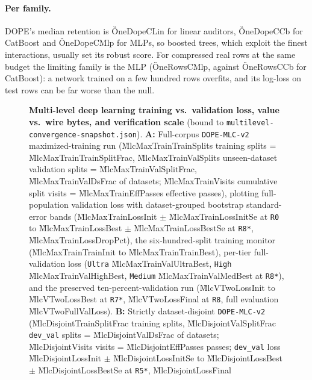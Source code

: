 \paragraph{Per family.}
DOPE's median retention is \G{OneDopeCLin} for linear auditors, \G{OneDopeCCb} for CatBoost and
\G{OneDopeCMlp} for MLPs, so boosted trees, which exploit the finest interactions, usually set its
robust score. For compressed real rows at the same budget the limiting family is the MLP
(\G{OneRowsCMlp}, against \G{OneRowsCCb} for CatBoost): a network trained on a few hundred rows
overfits, and its log-loss on test rows can be far worse than the null.

\begin{figure}[t]
  \centering
  \caption{\textbf{Multi-level deep learning training vs.\ validation loss, value vs.\ wire bytes, and
  verification scale} (bound to \texttt{multilevel-convergence-snapshot.json}).
  \textbf{A:} Full-corpus \texttt{DOPE-MLC-v2} maximized-training run (\G{MlcMaxTrainTrainSplits}
  training splits = \G{MlcMaxTrainTrainSplitFrac}, \G{MlcMaxTrainValSplits} unseen-dataset validation
  splits = \G{MlcMaxTrainValSplitFrac}, \G{MlcMaxTrainValDsFrac} of datasets; \G{MlcMaxTrainVisits}
  cumulative split visits = \G{MlcMaxTrainEffPasses} effective passes), plotting full-population
  validation loss with dataset-grouped bootstrap standard-error bands (\G{MlcMaxTrainLossInit} $\pm$
  \G{MlcMaxTrainLossInitSe} at \texttt{R0} to \G{MlcMaxTrainLossBest} $\pm$ \G{MlcMaxTrainLossBestSe}
  at \texttt{R8*}, \G{MlcMaxTrainLossDropPct}), the six-hundred-split training monitor
  (\G{MlcMaxTrainTrainInit} to \G{MlcMaxTrainTrainBest}), per-tier full-validation loss (\texttt{Ultra}
  \G{MlcMaxTrainValUltraBest}, \texttt{High} \G{MlcMaxTrainValHighBest}, \texttt{Medium}
  \G{MlcMaxTrainValMedBest} at \texttt{R8*}), and the preserved ten-percent-validation run
  (\G{MlcVTwoLossInit} to \G{MlcVTwoLossBest} at \texttt{R7*}, \G{MlcVTwoLossFinal} at \texttt{R8},
  full evaluation \G{MlcVTwoFullValLoss}). \textbf{B:} Strictly dataset-disjoint \texttt{DOPE-MLC-v2}
  (\G{MlcDisjointTrainSplitFrac} training splits, \G{MlcDisjointValSplitFrac} \texttt{dev\_val} splits =
  \G{MlcDisjointValDsFrac} of datasets; \G{MlcDisjointVisits} visits = \G{MlcDisjointEffPasses}
  passes; \texttt{dev\_val} loss \G{MlcDisjointLossInit} $\pm$ \G{MlcDisjointLossInitSe} to
  \G{MlcDisjointLossBest} $\pm$ \G{MlcDisjointLossBestSe} at \texttt{R5*}, \G{MlcDisjointLossFinal}
}
\end{figure}
